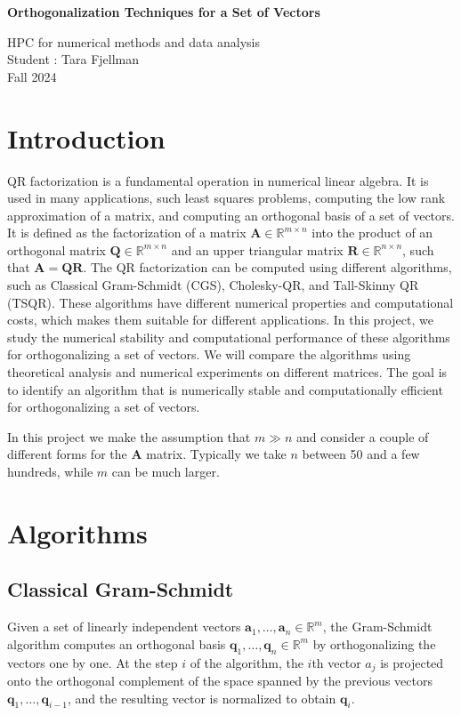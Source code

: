 \documentclass[a4paper, 12pt,oneside]{article}
\begin{document}
 
	\begin{center}
	    \Large
	    \textbf{Orthogonalization Techniques for a Set of Vectors}
	        
	    \vspace{0.4cm}
	    \large
		HPC for numerical methods and data analysis \\
	    Student : Tara Fjellman \\
	    \small{Fall 2024}
	\end{center}
	\section{Introduction}
	QR factorization is a fundamental operation in numerical linear algebra. It is used in many applications, such least squares problems, computing the low rank approximation of a matrix, and computing an orthogonal basis of a set of vectors. It is defined as the factorization of a matrix $\mathbf{A}\in \mathbb{R}^{m \times n}$ into the product of an orthogonal matrix $\mathbf{Q}\in \mathbb{R}^{m \times n}$ and an upper triangular matrix $\mathbf{R}\in \mathbb{R}^{n \times n}$, such that $\mathbf{A} = \mathbf{Q} \mathbf{R}$. The QR factorization can be computed using different algorithms, such as Classical Gram-Schmidt (CGS), Cholesky-QR, and Tall-Skinny QR (TSQR). These algorithms have different numerical properties and computational costs, which makes them suitable for different applications. In this project, we study the numerical stability and computational performance of these algorithms for orthogonalizing a set of vectors. We will compare the algorithms using theoretical analysis and numerical experiments on different matrices. The goal is to identify an algorithm that is numerically stable and computationally efficient for orthogonalizing a set of vectors.

	In this project we make the assumption that $m \gg n$ and consider a couple of different forms for the $\mathbf{A}$ matrix. Typically we take $n$ between 50 and a few hundreds, while $m$ can be much larger.
	\section{Algorithms}
		\subsection{Classical Gram-Schmidt}
			Given a set of linearly independent vectors $\mathbf{a}_1, \ldots, \mathbf{a}_n \in \mathbb{R}^m$, the Gram-Schmidt algorithm computes an orthogonal basis $\mathbf{q}_1, \ldots, \mathbf{q}_n \in \mathbb{R}^m$ by orthogonalizing the vectors one by one. At the step $i$ of the algorithm, the $i$th vector $a_j$ is projected onto the orthogonal complement of the space spanned by the previous vectors $\mathbf{q}_1, \ldots, \mathbf{q}_{i-1}$, and the resulting vector is normalized to obtain $\mathbf{q}_i$.
\end{document}

